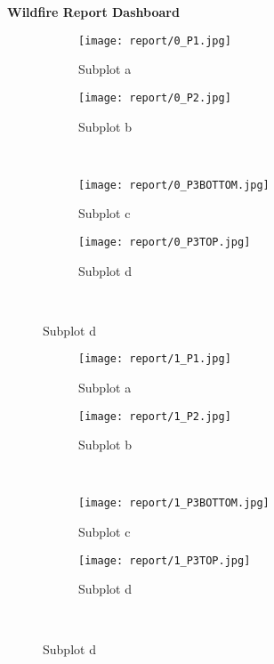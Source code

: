 \documentclass{article}%
\begin{document}
\newpage%

	\LARGE \textbf{Wildfire Report Dashboard}
\label{sec:WildfireEvolution}%


\begin{figure}[h!]%
\caption{1HAFTERSTARTFIRE}%
\centering%
\begin{subfigure}{0.45\textwidth}%
\texttt{[image: report/0\_P1.jpg]}%
\caption{Subplot a}%
\end{subfigure}%
\begin{subfigure}{0.45\textwidth}%
\texttt{[image:  report/0\_P2.jpg]}%
\caption{Subplot b}%
\end{subfigure}%
\\%
\begin{subfigure}{0.45\textwidth}%
\texttt{[image:  report/0\_P3BOTTOM.jpg]}%
\caption{Subplot c}%
\end{subfigure}%
\begin{subfigure}{0.45\textwidth}%
\texttt{[image:  report/0\_P3TOP.jpg]}%
\caption{Subplot d}%
\end{subfigure}%
\\%
\end{figure}

%


\begin{figure}[h!]%
\caption{2HAFTERSTARTFIRE}%
\centering%
\begin{subfigure}{0.45\textwidth}%
\texttt{[image:  report/1\_P1.jpg]}%
\caption{Subplot a}%
\end{subfigure}%
\begin{subfigure}{0.45\textwidth}%
\texttt{[image:  report/1\_P2.jpg]}%
\caption{Subplot b}%
\end{subfigure}%
\\%
\begin{subfigure}{0.45\textwidth}%
\texttt{[image:  report/1\_P3BOTTOM.jpg]}%
\caption{Subplot c}%
\end{subfigure}%
\begin{subfigure}{0.45\textwidth}%
\texttt{[image:  report/1\_P3TOP.jpg]}%
\caption{Subplot d}%
\end{subfigure}%
\\%
\end{figure}

%
\end{document}

